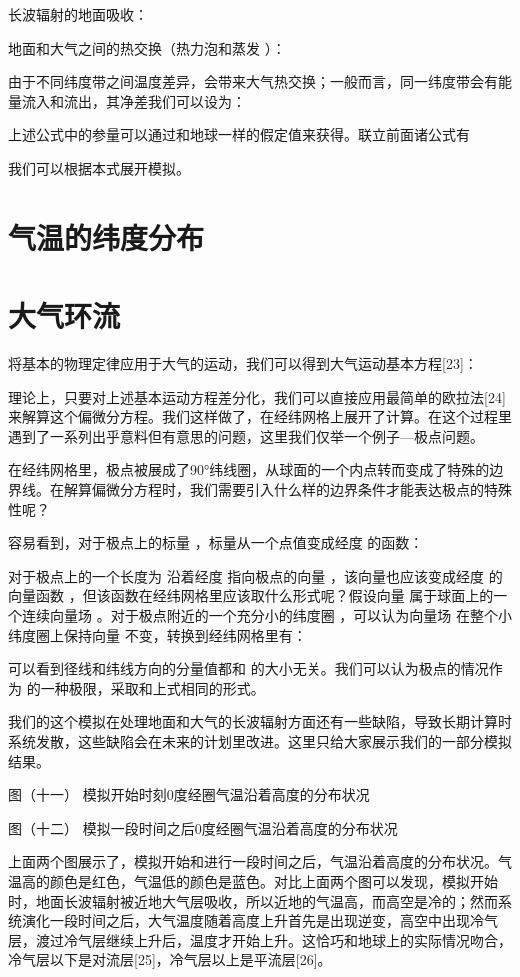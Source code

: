 \documentclass[a4paper,10.5pt]{book}
\begin{document}
长波辐射的地面吸收：

地面和大气之间的热交换（热力泡和蒸发 ）：

由于不同纬度带之间温度差异，会带来大气热交换；一般而言，同一纬度带会有能量流入和流出，其净差我们可以设为：

上述公式中的参量可以通过和地球一样的假定值来获得。联立前面诸公式有

我们可以根据本式展开模拟。


\section{气温的纬度分布}

\section{大气环流}

将基本的物理定律应用于大气的运动，我们可以得到大气运动基本方程[23]：



理论上，只要对上述基本运动方程差分化，我们可以直接应用最简单的欧拉法[24]来解算这个偏微分方程。我们这样做了，在经纬网格上展开了计算。在这个过程里遇到了一系列出乎意料但有意思的问题，这里我们仅举一个例子—极点问题。

在经纬网格里，极点被展成了90°纬线圈，从球面的一个内点转而变成了特殊的边界线。在解算偏微分方程时，我们需要引入什么样的边界条件才能表达极点的特殊性呢？

容易看到，对于极点上的标量  ，标量从一个点值变成经度  的函数：



对于极点上的一个长度为  沿着经度  指向极点的向量  ，该向量也应该变成经度  的向量函数  ，但该函数在经纬网格里应该取什么形式呢？假设向量  属于球面上的一个连续向量场  。对于极点附近的一个充分小的纬度圈 ，可以认为向量场  在整个小纬度圈上保持向量  不变，转换到经纬网格里有：



可以看到径线和纬线方向的分量值都和  的大小无关。我们可以认为极点的情况作为  的一种极限，采取和上式相同的形式。

我们的这个模拟在处理地面和大气的长波辐射方面还有一些缺陷，导致长期计算时系统发散，这些缺陷会在未来的计划里改进。这里只给大家展示我们的一部分模拟结果。


图（十一）
模拟开始时刻0度经圈气温沿着高度的分布状况



图（十二）
模拟一段时间之后0度经圈气温沿着高度的分布状况

上面两个图展示了，模拟开始和进行一段时间之后，气温沿着高度的分布状况。气温高的颜色是红色，气温低的颜色是蓝色。对比上面两个图可以发现，模拟开始时，地面长波辐射被近地大气层吸收，所以近地的气温高，而高空是冷的；然而系统演化一段时间之后，大气温度随着高度上升首先是出现逆变，高空中出现冷气层，渡过冷气层继续上升后，温度才开始上升。这恰巧和地球上的实际情况吻合，冷气层以下是对流层[25]，冷气层以上是平流层[26]。
\end{document}

